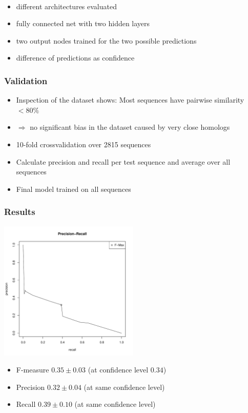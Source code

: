 \documentclass{beamer}
\begin{document}
\begin{frame}
\begin{center}
\begin{tikzpicture}[scale=0.8]
	\end{tikzpicture}
\end{center}
	\hfill\\
	\begin{itemize}
		\item different architectures evaluated
		\item fully connected net with two hidden layers
		\item two output nodes trained for the two possible predictions
		\item difference of predictions as confidence
	\end{itemize}	
\end{frame}

\begin{frame}
	\frametitle{Validation}
	
	\begin{itemize}
		\item Inspection of the dataset shows: Most sequences have pairwise similarity $< 80\%$
		\item[] $\Rightarrow$ no significant bias in the dataset caused by very close homologs
		\item 10-fold crossvalidation over 2815 sequences 
		\item Calculate precision and recall per test sequence and average over all sequences
		\item Final model trained on all sequences
	\end{itemize}
\end{frame}

\begin{frame}
	\frametitle{Results}
	\begin{center}
	\includegraphics[width=0.5\textwidth]{PreRec_3_folds.pdf}
	\end{center}
	\begin{itemize}
		\item F-measure $0.35\pm0.03$ (at confidence level $0.34$)
		\item Precision $0.32\pm0.04$ (at same confidence level)
		\item Recall  $0.39\pm0.10$ (at same confidence level)
	\end{itemize}		
\end{frame}
\end{document}
